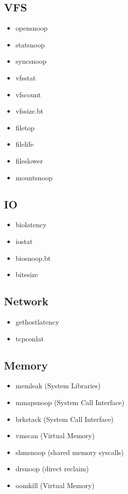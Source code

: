 \documentclass{beamer}
\begin{document}
\subsection{VFS}
\begin{frame}
	\begin{itemize}
		\item<+-> opensnoop
		\item<+-> statsnoop 
		\item<+-> syncsnoop
		\item<+-> vfsstat
		\item<+-> vfscount
		\item<+-> vfssize.bt
		\item<+-> filetop
		\item<+-> filelife
		\item<+-> fileslower
		\item<+-> mountsnoop
	\end{itemize}
\end{frame}

\subsection{IO}
\begin{frame}
	\begin{itemize}
		\item<+-> biolatency
		\item<+-> iostat 
		\item<+-> biosnoop.bt
		\item<+-> bitesize
	\end{itemize}
\end{frame}

\subsection{Network}
\begin{frame}
	\begin{itemize}
		\item<+-> gethostlatency
		\item<+-> tcpconlat 
	\end{itemize}
\end{frame}

\subsection{Memory}
\begin{frame}
	\begin{itemize}
		\item<+-> memleak (System Libraries)
		\item<+-> mmapsnoop (System Call Interface) 
		\item<+-> brkstack (System Call Interface)
		\item<+-> vmscan (Virtual Memory)
		\item<+-> shmsnoop (shared memory syscalls)
		\item<+-> drsnoop (direct reclaim)
		\item<+-> oomkill (Virtual Memory)
	\end{itemize}
\end{frame}
\end{document}
